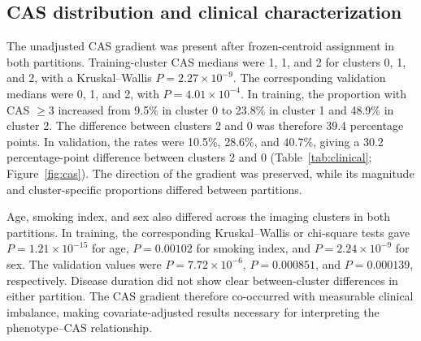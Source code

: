 \documentclass[utf8]{FrontiersinVancouver}
\begin{document}
\begin{table}
\centering
\caption{Training and fixed validation partition characteristics by imaging cluster.}
\label{tab:clinical}
\small
{}%
\end{table}

\subsection{CAS distribution and clinical characterization}
The unadjusted CAS gradient was present after frozen-centroid assignment in both partitions. Training-cluster CAS medians were 1, 1, and 2 for clusters 0, 1, and 2, with a Kruskal--Wallis $P=2.27\times10^{-9}$. The corresponding validation medians were 0, 1, and 2, with $P=4.01\times10^{-4}$. In training, the proportion with CAS $\geq3$ increased from 9.5\% in cluster 0 to 23.8\% in cluster 1 and 48.9\% in cluster 2. The difference between clusters 2 and 0 was therefore 39.4 percentage points. In validation, the rates were 10.5\%, 28.6\%, and 40.7\%, giving a 30.2 percentage-point difference between clusters 2 and 0 (Table~\ref{tab:clinical}; Figure~\ref{fig:cas}). The direction of the gradient was preserved, while its magnitude and cluster-specific proportions differed between partitions.

Age, smoking index, and sex also differed across the imaging clusters in both partitions. In training, the corresponding Kruskal--Wallis or chi-square tests gave $P=1.21\times10^{-15}$ for age, $P=0.00102$ for smoking index, and $P=2.24\times10^{-9}$ for sex. The validation values were $P=7.72\times10^{-6}$, $P=0.000851$, and $P=0.000139$, respectively. Disease duration did not show clear between-cluster differences in either partition. The CAS gradient therefore co-occurred with measurable clinical imbalance, making covariate-adjusted results necessary for interpreting the phenotype--CAS relationship.
\end{document}

